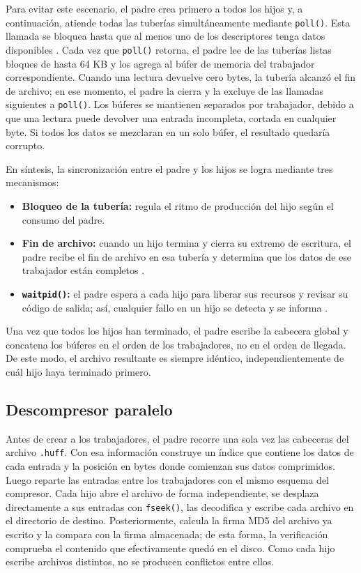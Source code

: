 \documentclass{report}
\begin{document}
Para evitar este escenario, el padre crea primero a todos los hijos y, a continuación, atiende todas las tuberías simultáneamente mediante \texttt{poll()}. Esta llamada se bloquea hasta que al menos uno de los descriptores tenga datos disponibles \cite{manpoll}. Cada vez que \texttt{poll()} retorna, el padre lee de las tuberías listas bloques de hasta 64 KB y los agrega al búfer de memoria del trabajador correspondiente. Cuando una lectura devuelve cero bytes, la tubería alcanzó el fin de archivo; en ese momento, el padre la cierra y la excluye de las llamadas siguientes a \texttt{poll()}. Los búferes se mantienen separados por trabajador, debido a que una lectura puede devolver una entrada incompleta, cortada en cualquier byte. Si todos los datos se mezclaran en un solo búfer, el resultado quedaría corrupto.

En síntesis, la sincronización entre el padre y los hijos se logra mediante tres mecanismos:

\begin{itemize}
    \item \textbf{Bloqueo de la tubería:} regula el ritmo de producción del hijo según el consumo del padre.
    \item \textbf{Fin de archivo:} cuando un hijo termina y cierra su extremo de escritura, el padre recibe el fin de archivo en esa tubería y determina que los datos de ese trabajador están completos \cite{manpipe}.
    \item \textbf{\texttt{waitpid()}:} el padre espera a cada hijo para liberar sus recursos y revisar su código de salida; así, cualquier fallo en un hijo se detecta y se informa \cite{manwait}.
\end{itemize}

Una vez que todos los hijos han terminado, el padre escribe la cabecera global y concatena los búferes en el orden de los trabajadores, no en el orden de llegada. De este modo, el archivo resultante es siempre idéntico, independientemente de cuál hijo haya terminado primero.

\subsection{Descompresor paralelo}

Antes de crear a los trabajadores, el padre recorre una sola vez las cabeceras del archivo \texttt{.huff}. Con esa información construye un índice que contiene los datos de cada entrada y la posición en bytes donde comienzan sus datos comprimidos. Luego reparte las entradas entre los trabajadores con el mismo esquema del compresor. Cada hijo abre el archivo de forma independiente, se desplaza directamente a sus entradas con \texttt{fseek()}, las decodifica y escribe cada archivo en el directorio de destino. Posteriormente, calcula la firma MD5 del archivo ya escrito y la compara con la firma almacenada; de esta forma, la verificación comprueba el contenido que efectivamente quedó en el disco. Como cada hijo escribe archivos distintos, no se producen conflictos entre ellos.
\end{document}
